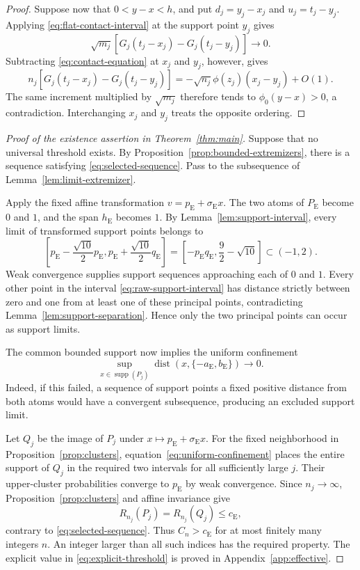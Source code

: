 \documentclass[aop]{imsart}
\theoremstyle{plain}
\theoremstyle{definition}
\theoremstyle{definition}
\newcommand{\ce}{c_{\mathrm E}}
\newcommand{\pe}{p_{\mathrm E}}
\newcommand{\qe}{q_{\mathrm E}}
\newcommand{\se}{\sigma_{\mathrm E}}
\newcommand{\Pe}{P_{\mathrm E}}
\newcommand{\aE}{a_{\mathrm E}}
\newcommand{\bE}{b_{\mathrm E}}
\DeclareMathOperator{\supp}{supp}
\DeclareMathOperator{\dist}{dist}
\begin{document}
\begin{proof}
Suppose now that \(0<y-x<h\), and put \(d_j=y_j-x_j\) and \(u_j=t_j-y_j\). Applying \eqref{eq:flat-contact-interval} at the support point \(y_j\) gives
\[
 \sqrt{m_j}[G_j(t_j-x_j)-G_j(t_j-y_j)]\longrightarrow0.
\]
Subtracting \eqref{eq:contact-equation} at \(x_j\) and \(y_j\), however, gives
\[
 n_j[G_j(t_j-x_j)-G_j(t_j-y_j)]
 =-\sqrt{n_j}\phi(z_j)(x_j-y_j)+O(1).
\]
The same increment multiplied by \(\sqrt{m_j}\) therefore tends to \(\phi_0(y-x)>0\), a contradiction. Interchanging \(x_j\) and \(y_j\) treats the opposite ordering.
\end{proof}

\begin{proof}[Proof of the existence assertion in Theorem~\ref{thm:main}]
Suppose that no universal threshold exists. By Proposition~\ref{prop:bounded-extremizers}, there is a sequence satisfying \eqref{eq:selected-sequence}. Pass to the subsequence of Lemma~\ref{lem:limit-extremizer}.

Apply the fixed affine transformation \(v=\pe+\se x\). The two atoms of \(\Pe\) become \(0\) and \(1\), and the span \(h_{\mathrm E}\) becomes \(1\). By Lemma~\ref{lem:support-interval}, every limit of transformed support points belongs to
\begin{equation}\label{eq:raw-support-interval}
 \left[\pe-\frac{\sqrt{10}}2\pe,
       \pe+\frac{\sqrt{10}}2\qe\right]
 =\left[-\pe\qe,\frac92-\sqrt{10}\right]
 \subset(-1,2).
\end{equation}
Weak convergence supplies support sequences approaching each of \(0\) and \(1\). Every other point in the interval \eqref{eq:raw-support-interval} has distance strictly between zero and one from at least one of these principal points, contradicting Lemma~\ref{lem:support-separation}. Hence only the two principal points can occur as support limits.

The common bounded support now implies the uniform confinement
\begin{equation}\label{eq:uniform-confinement}
 \sup_{x\in\supp(P_j)}\dist(x,\{-\aE,\bE\})\longrightarrow0.
\end{equation}
Indeed, if this failed, a sequence of support points a fixed positive distance from both atoms would have a convergent subsequence, producing an excluded support limit.

Let \(Q_j\) be the image of \(P_j\) under \(x\mapsto\pe+\se x\). For the fixed neighborhood in Proposition~\ref{prop:clusters}, equation~\eqref{eq:uniform-confinement} places the entire support of \(Q_j\) in the required two intervals for all sufficiently large \(j\). Their upper-cluster probabilities converge to \(\pe\) by weak convergence. Since \(n_j\to\infty\), Proposition~\ref{prop:clusters} and affine invariance give
\[
 R_{n_j}(P_j)=R_{n_j}(Q_j)\le\ce,
\]
contrary to \eqref{eq:selected-sequence}. Thus \(C_n>\ce\) for at most finitely many integers \(n\). An integer larger than all such indices has the required property. The explicit value in \eqref{eq:explicit-threshold} is proved in Appendix~\ref{app:effective}.
\end{proof}
\end{document}
